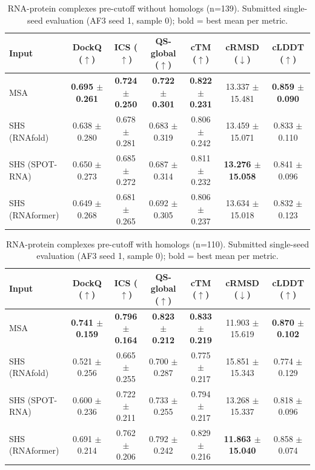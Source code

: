 \begin{table}[htbp]
\centering
\caption{RNA-protein complexes pre-cutoff without homologs (n=139). Submitted single-seed evaluation (AF3 seed 1, sample 0); bold = best mean per metric.}
\label{tab:rna_protein_complexes_pre_cutoff_without_homologs}
\begin{tabular}{lcccccc}
\toprule
Input & DockQ ($\uparrow$) & ICS ($\uparrow$) & QS-global ($\uparrow$) & cTM ($\uparrow$) & cRMSD ($\downarrow$) & cLDDT ($\uparrow$) \\
\midrule
MSA & \textbf{0.695 $\pm$ 0.261} & \textbf{0.724 $\pm$ 0.250} & \textbf{0.722 $\pm$ 0.301} & \textbf{0.822 $\pm$ 0.231} & 13.337 $\pm$ 15.481 & \textbf{0.859 $\pm$ 0.090} \\
SHS (RNAfold) & 0.638 $\pm$ 0.280 & 0.678 $\pm$ 0.281 & 0.683 $\pm$ 0.319 & 0.806 $\pm$ 0.242 & 13.459 $\pm$ 15.071 & 0.833 $\pm$ 0.110 \\
SHS (SPOT-RNA) & 0.650 $\pm$ 0.273 & 0.685 $\pm$ 0.272 & 0.687 $\pm$ 0.314 & 0.811 $\pm$ 0.232 & \textbf{13.276 $\pm$ 15.058} & 0.841 $\pm$ 0.096 \\
SHS (RNAformer) & 0.649 $\pm$ 0.268 & 0.681 $\pm$ 0.265 & 0.692 $\pm$ 0.305 & 0.806 $\pm$ 0.237 & 13.634 $\pm$ 15.018 & 0.832 $\pm$ 0.123 \\
\bottomrule
\end{tabular}
\end{table}

\begin{table}[htbp]
\centering
\caption{RNA-protein complexes pre-cutoff with homologs (n=110). Submitted single-seed evaluation (AF3 seed 1, sample 0); bold = best mean per metric.}
\label{tab:rna_protein_complexes_pre_cutoff_with_homologs}
\begin{tabular}{lcccccc}
\toprule
Input & DockQ ($\uparrow$) & ICS ($\uparrow$) & QS-global ($\uparrow$) & cTM ($\uparrow$) & cRMSD ($\downarrow$) & cLDDT ($\uparrow$) \\
\midrule
MSA & \textbf{0.741 $\pm$ 0.159} & \textbf{0.796 $\pm$ 0.164} & \textbf{0.823 $\pm$ 0.212} & \textbf{0.833 $\pm$ 0.219} & 11.903 $\pm$ 15.619 & \textbf{0.870 $\pm$ 0.102} \\
SHS (RNAfold) & 0.521 $\pm$ 0.256 & 0.665 $\pm$ 0.255 & 0.700 $\pm$ 0.287 & 0.775 $\pm$ 0.217 & 15.851 $\pm$ 15.343 & 0.774 $\pm$ 0.129 \\
SHS (SPOT-RNA) & 0.600 $\pm$ 0.236 & 0.722 $\pm$ 0.211 & 0.733 $\pm$ 0.255 & 0.794 $\pm$ 0.217 & 13.268 $\pm$ 15.337 & 0.818 $\pm$ 0.096 \\
SHS (RNAformer) & 0.691 $\pm$ 0.214 & 0.762 $\pm$ 0.206 & 0.792 $\pm$ 0.242 & 0.829 $\pm$ 0.216 & \textbf{11.863 $\pm$ 15.040} & 0.858 $\pm$ 0.074 \\
\bottomrule
\end{tabular}
\end{table}

